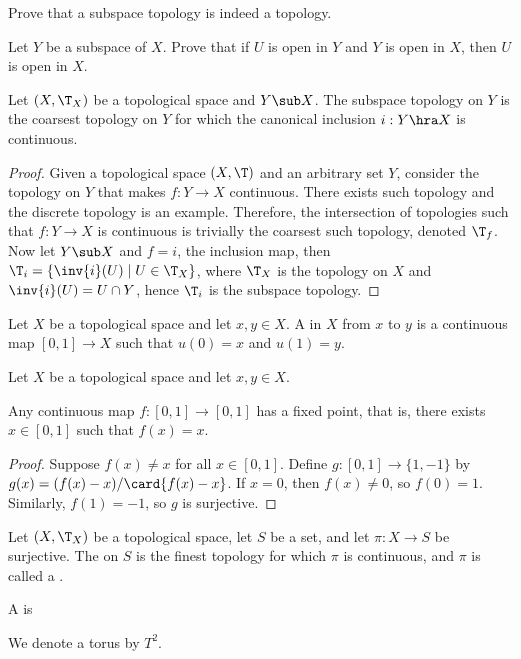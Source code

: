 \documentclass[10pt]{article}
\begin{document}
\begin{problem}
    Prove that a subspace topology is indeed a topology.
\end{problem}
\begin{problem}
    Let $Y$ be a subspace of $X$. Prove that if $U$ is open in $Y$ and $Y$ is open in $X$, then $U$ is open in $X$.
\end{problem}
\begin{proposition}
    Let $(X,{\T}_{X})$ be a topological space and $Y\sub X$. The subspace topology on $Y$ is the coarsest topology on $Y$ for which the canonical inclusion $i:Y\hra X$ is continuous.
\end{proposition}
\begin{proof}
    Given a topological space $(X,{\T})$ and an arbitrary set $Y$, consider the topology on $Y$ that makes $f:Y\to X$ continuous. There exists such topology and the discrete topology is an example. Therefore, the intersection of topologies such that $f:Y\to X$ is continuous is trivially the coarsest such topology, denoted ${\T}_{f}$. Now let $Y\sub X$ and $f=i$, the inclusion map, then ${\T}_{i}=\{\inv{i}(U)\mid U\in{\T}_{X}\}$, where ${\T}_{X}$ is the topology on $X$ and $\inv{i}(U)=U\cap Y$, hence ${\T}_{i}$ is the subspace topology.
\end{proof}


\begin{definition}
    Let $X$ be a topological space and let $x,y\in X$. A  in $X$ from $x$ to $y$ is a continuous map $[0,1]\to X$ such that $u(0)=x$ and $u(1)=y$.
\end{definition}
\par
Let $X$ be a topological space and let $x,y\in X$. 


\begin{theorem}
    Any continuous map $f:[0,1]\to[0,1]$ has a fixed point, that is, there exists $x\in[0,1]$ such that $f(x)=x$.
\end{theorem}
\begin{proof}
    Suppose $f(x)\ne x$ for all $x\in[0,1]$. Define $g:[0,1]\to\{1,-1\}$ by $g(x)=(f(x)-x)/\card{f(x)-x}$. If $x=0$, then $f(x)\ne 0$, so $f(0)=1$. Similarly, $f(1)=-1$, so $g$ is surjective.
\end{proof}




\begin{definition}
    Let $(X,{\T}_{X})$ be a topological space, let $S$ be a set, and let $\pi:X\to S$ be surjective. The  on $S$ is the finest topology for which $\pi$ is continuous, and $\pi$ is called a .
\end{definition}
\begin{example}
    A  is 

    We denote a torus by ${T}^{2}$.
\end{example}
\end{document}
